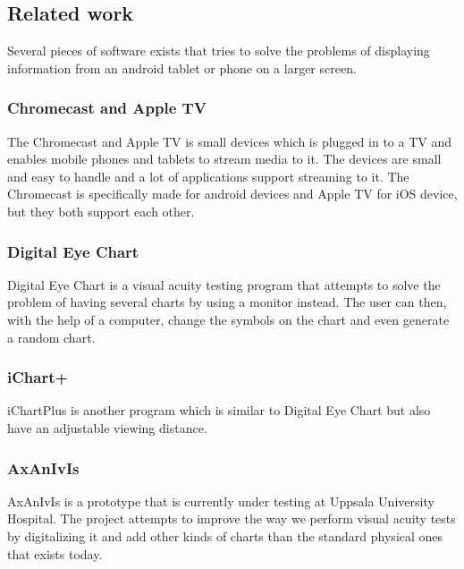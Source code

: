 \documentclass[12pt,a4paper,notitlepage]{report}
\begin{document}
\subsection{Related work}
Several pieces of software exists that tries to solve the problems of displaying information from an android tablet or phone on a larger screen.

\subsubsection{Chromecast and Apple TV}
The Chromecast \cite{chromecast} and Apple TV \cite{appletv} is small devices which is plugged in to a TV and enables mobile phones and tablets to stream media to it. The devices are small and easy to handle and a lot of applications support streaming to it. The Chromecast is specifically made for android devices and Apple TV for iOS device, but they both support each other.

\subsubsection{Digital Eye Chart}
 Digital Eye Chart is a visual acuity testing program that attempts to solve the problem of having several charts by using a monitor instead. The user can then, with the help of a computer, change the symbols on the chart and even generate a random chart. \cite{digitaleyechart}
\subsubsection{iChart+}
iChartPlus is another program which is similar to Digital Eye Chart but also have an adjustable viewing distance. \cite{ichartplus}

\subsubsection{AxAnIvIs}
AxAnIvIs is a prototype that is currently under testing at Uppsala University Hospital. The project attempts to improve the way we perform visual acuity tests by digitalizing it and add other kinds of charts than the standard physical ones that exists today.


\end{document}
